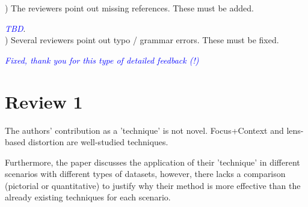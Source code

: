 \documentclass[a4paper,10pt]{article}
\newcommand{\rr}[1]{\emph{\textcolor{blue}{#1}}}
\begin{document}
) The reviewers point out missing references. These must be added.

    \rr{TBD}.\\

) Several reviewers point out typo / grammar errors. These must be fixed.

    \rr{Fixed, thank you for this type of detailed feedback (!)}

\section{Review 1}

    The authors' contribution as a 'technique' is not novel. Focus+Context and lens-
    based distortion are well-studied techniques. 
    
    Furthermore, the paper discusses the
    application of their 'technique' in different scenarios with different types of
    datasets, however, there lacks a comparison (pictorial or quantitative) to justify
    why their method is more effective than the already existing techniques for each
    scenario. 
    
\end{document}

